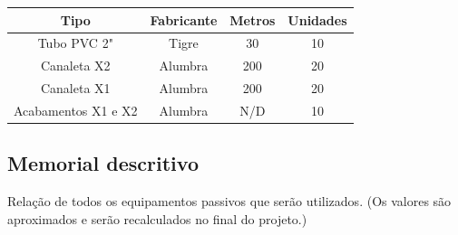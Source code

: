 \documentclass[	DIV=calc,%
							paper=a4,%
							fontsize=12pt,%
							onecolumn]{scrartcl}	 					%
\begin{document}
\begin{center}

	\renewcommand{\arraystretch}{1.5}
	\begin{tabular}{|c|c|c|c|}
		\hline
		\textbf{Tipo}       & \textbf{Fabricante} & \multicolumn{1}{l|}{\textbf{Metros}} & \multicolumn{1}{l|}{\textbf{Unidades}} \\ \hline
		Tubo PVC 2"         & Tigre               & 30                                   & 10                                     \\ \hline
		Canaleta X2         & Alumbra             & 200                                  & 20                                     \\ \hline
		Canaleta X1         & Alumbra             & 200                                  & 20                                     \\ \hline
		Acabamentos X1 e X2 & Alumbra             & N/D                                  & 10                                     \\ \hline
	\end{tabular}
    	
\end{center}






\subsection{Memorial descritivo}

Relação de todos os equipamentos passivos que serão utilizados. (Os valores são aproximados e serão recalculados no final do projeto.) 
\\






	
\end{document}
